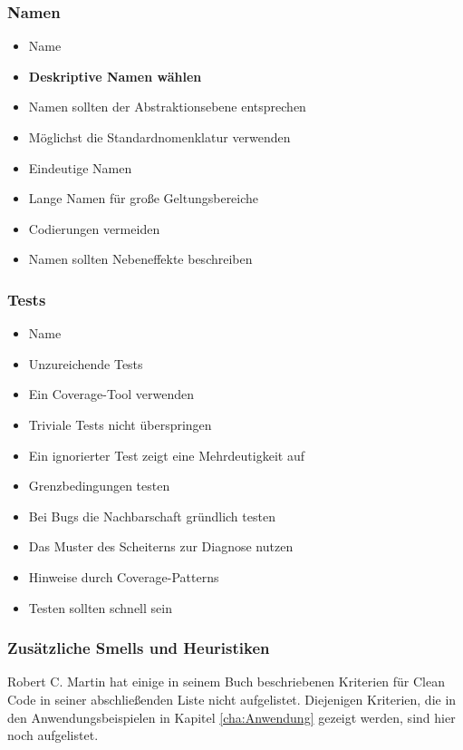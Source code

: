 \subsubsection{Namen}

\begin{itemize}
			\item Name
			\item \textbf{Deskriptive Namen wählen}
			\item Namen sollten der Abstraktionsebene entsprechen 
			\item Möglichst die Standardnomenklatur verwenden 
			\item Eindeutige Namen 
			\item Lange Namen für große Geltungsbereiche 
			\item Codierungen vermeiden 
			\item Namen sollten Nebeneffekte beschreiben
\end{itemize}

\subsubsection{Tests}

\begin{itemize}
	\item Name 
	\item Unzureichende Tests 
	\item Ein Coverage-Tool verwenden 
	\item Triviale Tests nicht überspringen 
	\item Ein ignorierter Test zeigt eine Mehrdeutigkeit auf 
	\item Grenzbedingungen testen 
	\item Bei Bugs die Nachbarschaft gründlich testen 
	\item Das Muster des Scheiterns zur Diagnose nutzen 
	\item Hinweise durch Coverage-Patterns 
	\item Testen sollten schnell sein 
\end{itemize}

\subsubsection{Zusätzliche Smells und Heuristiken}
Robert C. Martin hat einige in seinem Buch beschriebenen Kriterien für Clean Code in seiner abschließenden Liste nicht aufgelistet. Diejenigen Kriterien, die in den Anwendungsbeispielen in Kapitel \ref{cha:Anwendung} gezeigt werden, sind hier noch aufgelistet.

